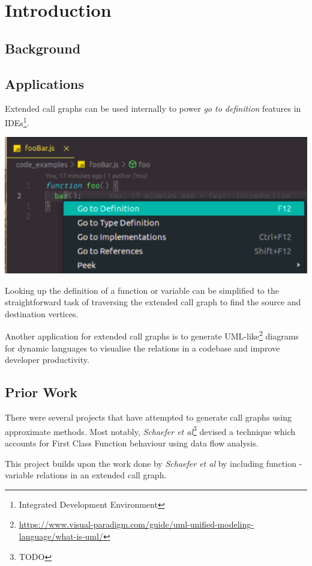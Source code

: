 \chapter{Introduction}

\section{Background}







\section{Applications}

Extended call graphs can be used internally to power \textit{go to definition} features in IDEs\footnote{Integrated Development Environment}.

\begin{center}
    \includegraphics[width=1\textwidth]{./images/goto_def.eps}
\end{center}

Looking up the definition of a function or variable can be simplified to the straightforward task of traversing the extended call graph to find the source and destination vertices.

Another application for extended call graphs is to generate UML-like\footnote{\url{https://www.visual-paradigm.com/guide/uml-unified-modeling-language/what-is-uml/}} diagrams for dynamic languages to visualise the relations in a codebase and improve developer productivity.

\section{Prior Work}

There were several projects that have attempted to generate call graphs using approximate methods. Most notably, \textit{Schaefer et al}\footnote{TODO} devised a technique which accounts for First Class Function behaviour using data flow analysis. 

This project builds upon the work done by \textit{Schaefer et al} by including function - variable relations in an extended call graph.
